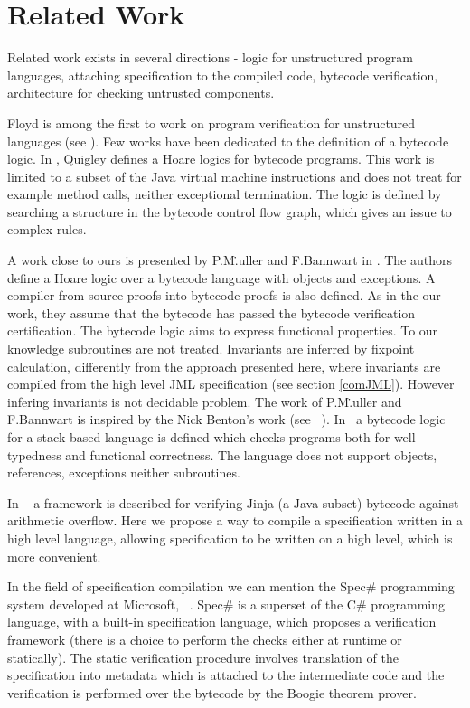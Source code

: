 \section{Related Work} \label{relWork}
    
Related work exists in several directions -  logic for unstructured program languages,  attaching specification to the compiled code, bytecode verification, architecture for
checking untrusted components.

Floyd is among the first to work on program verification for unstructured languages (see \cite{F67amp}).
Few works have been dedicated to the definition of a bytecode logic. In \cite{Quigley}, Quigley defines a Hoare logics for bytecode programs. 
 This work is limited to a subset of the Java virtual machine instructions and does not treat for example method calls, 
 neither exceptional termination. The logic is defined by searching a structure in the bytecode control flow graph, 
 which gives an issue to complex rules.

A work close to ours is presented by P.M\..uller and F.Bannwart in \cite{BM05plb}. The authors define a Hoare logic over a 
bytecode language with objects and  exceptions. A compiler from source proofs into bytecode proofs is also defined. 
As in the our work, they assume that the bytecode has passed the bytecode verification certification. The bytecode logic aims to 
express functional properties. To our knowledge subroutines are not treated. Invariants are inferred by fixpoint calculation, differently 
from the approach presented here, where invariants are compiled from the high level JML specification (see section \ref{comJML}). 
However infering invariants is not decidable problem. The work of P.M\..uller and F.Bannwart is inspired by the Nick Benton's work (see ~\cite{B04tlsj}). 
In~\cite{B04tlsj} a bytecode logic for a stack based language is defined which checks programs both for well - typedness and functional correctness. 
 The language does not support objects, references, exceptions neither subroutines. 

In ~\cite{WildmoserN-ESOP05} a framework is described for verifying Jinja (a Java subset) bytecode against arithmetic overflow. 
Here we propose a way to compile a specification written in a high level language, allowing specification to be written on a 
high level, which is more convenient.

In the field of specification compilation we can mention the Spec\# programming system developed at Microsoft,
~\cite{BLS04sp}. Spec\#  is a superset of the C\# programming language, with a built-in  specification language,
which proposes a verification framework (there is a choice to perform the checks either at runtime or statically). 
 The static verification procedure  involves translation of the specification into metadata which is attached to the intermediate code 
 and the verification is performed over the bytecode by the Boogie theorem prover.

